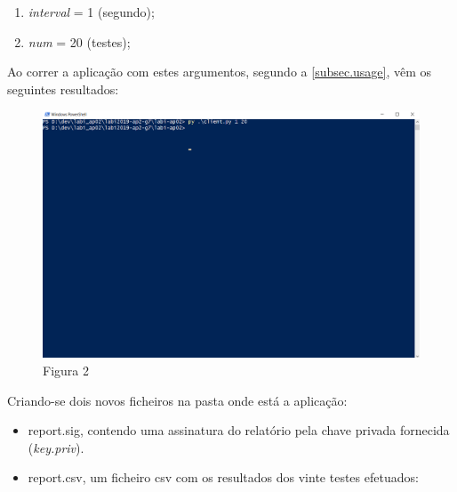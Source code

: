 \documentclass{report}
\begin{document}
\begin{enumerate}
\item \textit{interval} = 1 (segundo);
\item \textit{num} = 20 (testes);
\end{enumerate}

Ao correr a aplicação com estes argumentos, segundo a \autoref{subsec.usage}, vêm os seguintes resultados:

\begin{figure}[h]
\includegraphics[width=\textwidth]{useExample2}
\caption{Figura 2}
\end{figure}

Criando-se dois novos ficheiros na pasta onde está a aplicação:

\begin{itemize}
\item report.sig, contendo uma assinatura do relatório pela chave privada fornecida (\textit{key.priv}).
\item report.csv, um ficheiro \ac{csv} com os resultados dos vinte testes efetuados:
\end{itemize}
\end{document}
